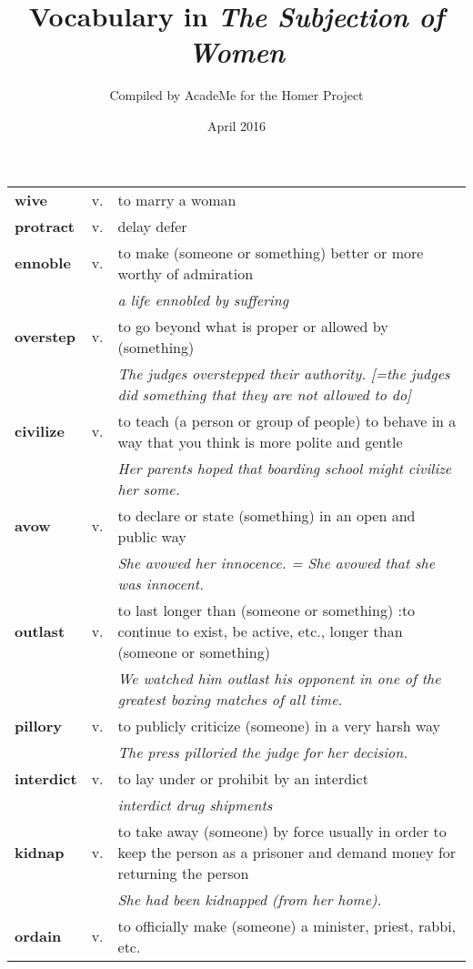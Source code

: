 \documentclass[a4paper]{article}
\title{Vocabulary in \textit{The Subjection of Women}}
\author{Compiled by AcadeMe for the Homer Project}
\date{April 2016}
\begin{document}
\maketitle
\begin{longtable}{llp{11cm}}
\textbf{wive} & v. &  to marry a woman\\[0.08cm]
\textbf{protract} & v. &  delay defer\\[0.08cm]
\textbf{ennoble} & v. &  to make (someone or something) better or more worthy of admiration \\
 & & \textit{a life ennobled by suffering}\\[0.08cm]
\textbf{overstep} & v. &  to go beyond what is proper or allowed by (something) \\
 & & \textit{The judges overstepped their authority. [=the judges did something that they are not allowed to do]}\\[0.08cm]
\textbf{civilize} & v. &  to teach (a person or group of people) to behave in a way that you think is more polite and gentle \\
 & & \textit{Her parents hoped that boarding school might civilize her some.}\\[0.08cm]
\textbf{avow} & v. &  to declare or state (something) in an open and public way \\
 & & \textit{She avowed her innocence. = She avowed that she was innocent.}\\[0.08cm]
\textbf{outlast} & v. &  to last longer than (someone or something) :to continue to exist, be active, etc., longer than (someone or something) \\
 & & \textit{We watched him outlast his opponent in one of the greatest boxing matches of all time.}\\[0.08cm]
\textbf{pillory} & v. &  to publicly criticize (someone) in a very harsh way \\
 & & \textit{The press pilloried the judge for her decision.}\\[0.08cm]
\textbf{interdict} & v. &  to lay under or prohibit by an interdict\\
 & & \textit{interdict drug shipments}\\[0.08cm]
\textbf{kidnap} & v. &  to take away (someone) by force usually in order to keep the person as a prisoner and demand money for returning the person \\
 & & \textit{She had been kidnapped (from her home).}\\[0.08cm]
\textbf{ordain} & v. &  to officially make (someone) a minister, priest, rabbi, etc. \\

\end{longtable}
\end{document}
